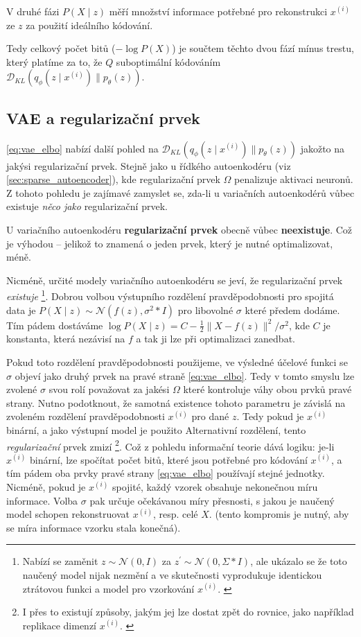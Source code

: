V druhé fázi $P(X\mid z)$ měří množství informace potřebné pro rekonstrukci $x^{(i)}$ ze $z$ za použití ideálního kódování.

Tedy celkový počet bitů ($- \log P(X)$) je součtem těchto dvou fází mínus trestu, který platíme za to, že $Q$ suboptimální kódováním $\mathcal{D}_{KL}(q_\phi(z\mid x^{(i)})\parallel p_\theta(z))$. 


\subsection{VAE a regularizační prvek}
\label{sec:vae_regulariazion_term}
\autoref{eq:vae_elbo} nabízí další pohled na $\mathcal{D}_{KL}(q_\phi(z\mid x^{(i)})\parallel p_\theta(z))$ jakožto na jakýsi regularizační prvek.
Stejně jako u řídkého autoenkodéru (viz \autoref{sec:sparse_autoencoder}), kde regularizační prvek $\Omega$ penalizuje aktivaci neuronů.
Z tohoto pohledu je zajímavé zamyslet se, zda-li u variačních autoenkodérů vůbec existuje \emph{něco jako} regularizační prvek.

U variačního autoenkodéru \textbf{regularizační prvek} obecně vůbec \textbf{neexistuje}.
Což je výhodou – jelikož to znamená o jeden prvek, který je nutné optimalizovat, méně.

Nicméně, určité modely variačního autoenkodéru se jeví, že regularizační prvek \emph{existuje}
\footnote{Nabízí se zaměnit $z \sim \mathcal{N}(0, I)$ za $z^\prime \sim \mathcal{N}(0, \Sigma * I)$, ale ukázalo se že toto naučený model nijak nezmění a ve skutečnosti vyprodukuje identickou ztrátovou funkci a model pro vzorkování $x^{(i)}$. \cite{Doersch2021}}.
Dobrou volbou výstupního rozdělení pravděpodobnosti pro spojitá data je $P(X\mid z) \sim \mathcal{N}(f(z), \sigma^2 * I)$ pro libovolné $\sigma$ které předem dodáme.
Tím pádem dostáváme $\log P(X\mid z) = C - \frac{1}{2} \| X - f(z) \|^2 / \sigma^2$, kde $C$ je konstanta, která nezávisí na $f$ a tak ji lze při optimalizaci zanedbat.

Pokud toto rozdělení pravděpodobnosti použijeme, ve výsledné účelové funkci se $\sigma$ objeví jako druhý prvek na pravé straně \autoref{eq:vae_elbo}.
Tedy v tomto smyslu lze zvolené $\sigma$ svou rolí považovat za jakési $\Omega$ které kontroluje váhy obou prvků pravé strany.
Nutno podotknout, že samotná existence tohoto parametru je závislá na zvoleném rozdělení pravděpodobnosti $x^{(i)}$ pro dané $z$.
Tedy pokud je $x^{(i)}$ binární, a jako výstupní model je použito Alternativní rozdělení, tento \emph{regularizační} prvek zmizí 
\footnote{I přes to existují způsoby, jakým jej lze dostat zpět do rovnice, jako například replikace dimenzí $x^{(i)}$. \cite{Doersch2021}}.
Což z pohledu informační teorie dává logiku: je-li $x^{(i)}$ binární, lze spočítat počet bitů, které jsou potřebné pro kódování $x^{(i)}$, a tím pádem oba prvky pravé strany \autoref{eq:vae_elbo} používají stejné jednotky.
Nicméně, pokud je $x^{(i)}$ spojité, každý vzorek obsahuje nekonečnou míru informace. Volba $\sigma$ pak určuje očekávanou míry přesnosti, s jakou je naučený model schopen rekonstruovat $x^{(i)}$, resp. celé $X$. (tento kompromis je nutný, aby se míra informace vzorku stala konečná).
